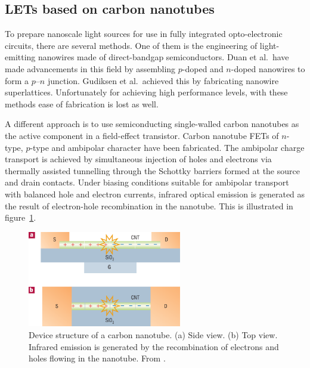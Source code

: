 \subsection{LETs based on carbon nanotubes} %


To prepare nanoscale light sources for use in fully integrated opto-electronic circuits, there are several methods. One of them is the engineering of light-emitting nanowires made of direct-bandgap semiconductors. Duan et al.\ have made advancements in this field by assembling $p$-doped and $n$-doped nanowires to form a $p$--$n$ junction. Gudiksen et al.~achieved this by fabricating nanowire superlattices. Unfortunately for achieving high performance levels, with these methods ease of fabrication is lost as well. %

A different approach is to use semiconducting single-walled carbon nanotubes as the active component in a field-effect transistor. Carbon nanotube FETs of $n$-type, $p$-type and ambipolar character have been fabricated. The ambipolar charge transport is achieved by simultaneous injection of holes and electrons via thermally assisted tunnelling through the Schottky barriers formed at the source and drain contacts. Under biasing conditions suitable for ambipolar transport with balanced hole and electron currents, infrared optical emission is generated as the result of electron-hole recombination in the nanotube. This is illustrated in figure~\ref{fig:carbontube}. 

\begin{figure}[!ht]
 \begin{center}
  \includegraphics[width=0.6\textwidth]{fig_1}
  \caption{Device structure of a carbon nanotube. (a) Side view. (b) Top view. Infrared emission is generated by the recombination of electrons and holes flowing in the nanotube. From \citet{Muccini}.}
  \label{fig:carbontube}
 \end{center}
\end{figure}

